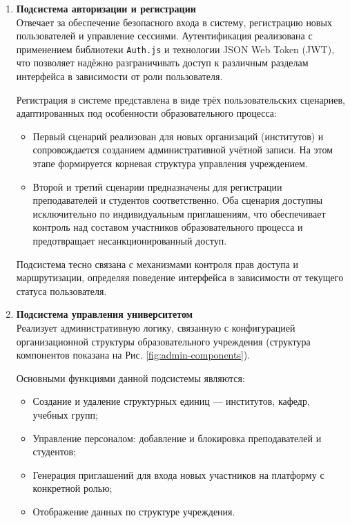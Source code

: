 \begin{enumerate}
  \item \textbf{Подсистема авторизации и регистрации}\\
  Отвечает за обеспечение безопасного входа в систему, регистрацию новых пользователей и управление сессиями. Аутентификация реализована с применением библиотеки \texttt{Auth.js} и технологии JSON Web Token (JWT), что позволяет надёжно разграничивать доступ к различным разделам интерфейса в зависимости от роли пользователя.  

  Регистрация в системе представлена в виде трёх пользовательских сценариев, адаптированных под особенности образовательного процесса:
  \begin{itemize}
    \item Первый сценарий реализован для новых организаций (институтов) и сопровождается созданием административной учётной записи. На этом этапе формируется корневая структура управления учреждением.
    \item Второй и третий сценарии предназначены для регистрации преподавателей и студентов соответственно. Оба сценария доступны исключительно по индивидуальным приглашениям, что обеспечивает контроль над составом участников образовательного процесса и предотвращает несанкционированный доступ.
  \end{itemize}
  
  Подсистема тесно связана с механизмами контроля прав доступа и маршрутизации, определяя поведение интерфейса в зависимости от текущего статуса пользователя.

  \item \textbf{Подсистема управления университетом}\\
  Реализует административную логику, связанную с конфигурацией организационной структуры образовательного учреждения (структура компонентов показана на Рис. \ref{fig:admin-components}).
  
  Основными функциями данной подсистемы являются:
  \begin{itemize}
    \item Создание и удаление структурных единиц — институтов, кафедр, учебных групп;
    \item Управление персоналом: добавление и блокировка преподавателей и студентов;
    \item Генерация приглашений для входа новых участников на платформу с конкретной ролью;
    \item Отображение данных по структуре учреждения.
  \end{itemize}
  

\end{enumerate}
